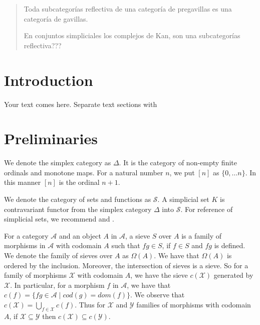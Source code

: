 \date{Received: date / Accepted: date}


\maketitle

\begin{abstract}
Toda subcategorías reflectiva de una categoría de pregavillas es una categoría de gavillas.

En conjuntos simpliciales los complejos de Kan, son una subcategorías reflectiva???
\end{abstract}

\section{Introduction}
\label{intro}
Your text comes here. Separate text sections with


\section{Preliminaries}
\label{sec:1}

We denote the simplex category as $\Delta$. It is the category of non-empty finite ordinals and monotone maps. For a natural number $n$, we put $[n]$ as $\{0,\dots n\}$. In this manner $[n]$ is the ordinal $n+1$.

We denote the category of sets and functions as $\mathcal{S}$. A simplicial set $K$ is contravariant functor from the simplex category $\Delta$ into $\mathcal{S}$. For reference of simplicial sets, we recommend \cite{goerss2009simplicial} and \cite{may1992simplicial}.

For a category $\mathcal{A}$ and an object $A$ in $\mathcal{A}$, a sieve $S$ over $A$ is a family of morphisms in $\mathcal{A}$ with codomain $A$ such that $fg\in S$, if $f\in S$ and $fg$ is defined. We denote the family of sieves over $A$ as $\Omega(A)$. We have that $\Omega(A)$ is ordered by the inclusion. Moreover, the intersection of sieves is a sieve. So for a family of morphisms $\mathcal{X}$ with codomain $A$, we have the sieve $c(\mathcal{X})$ generated by $\mathcal{X}$. In particular, for a morphism $f$ in $\mathcal{A}$, we have that $c(f)=\{fg\in\mathcal{A}\mid cod(g)=dom(f)\}$. We observe that $c(\mathcal{X})=\bigcup_{f\in\mathcal{X}}c(f)$. Thus for  $\mathcal{X}$ and $\mathcal{Y}$ families of morphisms with codomain $A$, if $\mathcal{X}\subseteq \mathcal{Y}$ then $c(\mathcal{X})\subseteq c(\mathcal{Y})$.

